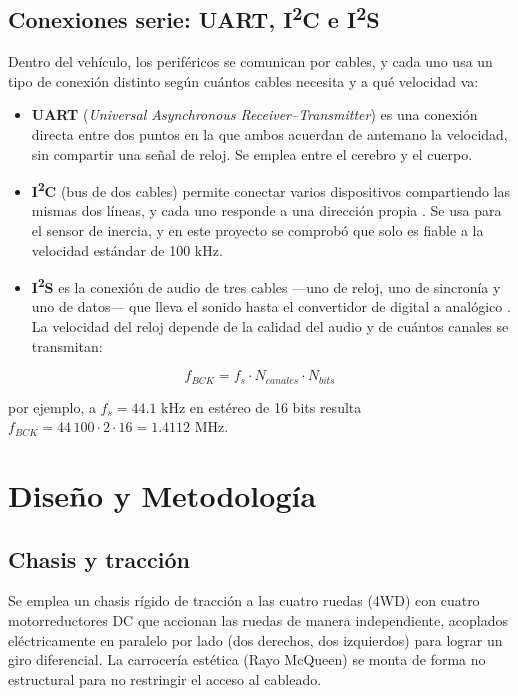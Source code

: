 \documentclass[journal]{IEEEtran}
\begin{document}
\subsection{Conexiones serie: UART, I\textsuperscript{2}C e I\textsuperscript{2}S}

Dentro del vehículo, los periféricos se comunican por cables, y cada uno usa un tipo de conexión distinto según cuántos cables necesita y a qué velocidad va:

\begin{itemize}
\item \textbf{UART} (\emph{Universal Asynchronous Receiver--Transmitter}) es una conexión directa entre dos puntos en la que ambos acuerdan de antemano la velocidad, sin compartir una señal de reloj. Se emplea entre el cerebro y el cuerpo.
\item \textbf{I\textsuperscript{2}C} (bus de dos cables) permite conectar varios dispositivos compartiendo las mismas dos líneas, y cada uno responde a una dirección propia \cite{i2c}. Se usa para el sensor de inercia, y en este proyecto se comprobó que solo es fiable a la velocidad estándar de 100 kHz.
\item \textbf{I\textsuperscript{2}S} es la conexión de audio de tres cables ---uno de reloj, uno de sincronía y uno de datos--- que lleva el sonido hasta el convertidor de digital a analógico \cite{i2s}. La velocidad del reloj depende de la calidad del audio y de cuántos canales se transmitan:
\end{itemize}

\begin{equation}
f_{BCK} = f_s \cdot N_{canales} \cdot N_{bits}
\end{equation}

\noindent por ejemplo, a $f_s = 44.1$ kHz en estéreo de 16 bits resulta $f_{BCK} = 44\,100 \cdot 2 \cdot 16 = 1.4112$ MHz.

\section{Diseño y Metodología}
 
\subsection{Chasis y tracción}
Se emplea un chasis rígido de tracción a las cuatro ruedas (4WD) con cuatro motorreductores DC que accionan las ruedas de manera independiente, acoplados eléctricamente en paralelo por lado (dos derechos, dos izquierdos) para lograr un giro diferencial. La carrocería estética (Rayo McQueen) se monta de forma no estructural para no restringir el acceso al cableado.
 
\end{document}
